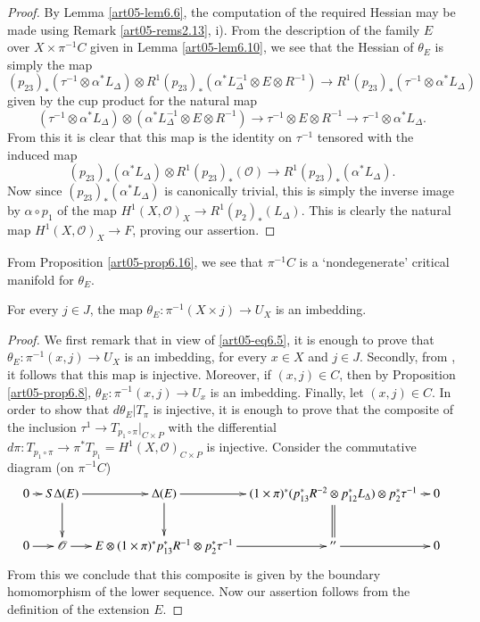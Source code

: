 \begin{proof}
By Lemma \ref{art05-lem6.6}, the computation of the required Hessian
may be made using Remark \ref{art05-rems2.13}, i). From the description
of the family $E$ over $X\times \pi^{-1}C$ given in
Lemma \ref{art05-lem6.10}, we see that the Hessian of $\theta_{E}$ is
simply the map
{\fontsize{10pt}{12pt}\selectfont
$$
(p_{23})_{*}(\tau^{-1}\otimes \alpha^{*}L_{\Delta})\otimes
R^{1}(p_{23})_{*}(\alpha^{*}L^{-1}_{\Delta}\otimes E\otimes R^{-1})\to
R^{1}(p_{23})_{*}(\tau^{-1}\otimes \alpha^{*}L_{\Delta})
$$}
given by the cup product for the natural map
$$
(\tau^{-1}\otimes \alpha^{*}L_{\Delta})\otimes
(\alpha^{*}L^{-1}_{\Delta}\otimes E\otimes R^{-1})\to \tau^{-1}\otimes
E\otimes R^{-1}\to \tau^{-1}\otimes \alpha^{*}L_{\Delta}.
$$
From this it is clear that this map is the identity on $\tau^{-1}$
tensored with the induced map
$$
(p_{23})_{*}(\alpha^{*}L_{\Delta})\otimes
R^{1}(p_{23})_{*}(\mathscr{O})\to
R^{1}(p_{23})_{*}(\alpha^{*}L_{\Delta}).
$$ 
Now since
$(p_{23})_{*}(\alpha^{*}L_{\Delta})$ is canonically trivial, this is
simply the inverse image by $\alpha\circ p_{1}$ of the map
$H^{1}(X,\mathscr{O})_{X}\to R^{1}(p_{2})_{*}(L_{\Delta})$. This is
clearly the natural map $H^{1}(X,\mathscr{O})_{X}\to F$, proving our
assertion. 
\end{proof}

\begin{remark}\label{art05-rem6.17}
From Proposition \ref{art05-prop6.16}, we see that $\pi^{-1}C$ is a
`nondegenerate' critical manifold for $\theta_{E}$. 
\end{remark}

\begin{proposition}\label{art05-prop6.18}
For every $j\in J$, the map $\theta_{E}:\pi^{-1}(X\times j)\to U_{X}$
is an imbedding.
\end{proposition}

\begin{proof}
We first remark that in view of \ref{art05-eq6.5}, it is enough to
prove that $\theta_{E}:\pi^{-1}(x,j)\to U_{X}$ is an imbedding, for
every $x\in X$ and $j\in J$. Secondly, from \cite[Lemma
10.1]{art05-key3}, it follows that this map is injective. Moreover, if
$(x,j)\in C$, then by Proposition \ref{art05-prop6.8},
$\theta_{E}:\pi^{-1}(x,j)\to U_{x}$ is an\pageoriginale
imbedding. Finally, let $(x,j)\in C$. In order to show that
$d\theta_{E}|T_{\pi}$ is injective, it is enough to prove that the
composite of the inclusion $\tau^{1}\to T_{p_{1}\circ\pi}|_{C\times
P}$ with the differential $d\pi
:T_{p_{1}\circ\pi}\to \pi^{*}T_{p_{1}}=H^{1}(X,\mathscr{O})_{C\times
P}$ is injective. Consider the commutative diagram (on $\pi^{-1}C$)
{\fontsize{9pt}{11pt}\selectfont
\[
\xymatrix@C=.25cm{
0\ar[r] & S\Delta(E)\ar[d]\ar[r] & \Delta(E)\ar[d]\ar[r] &
(1\times \pi)^{*}(p^{*}_{13}R^{-2}\otimes
p^{*}_{12}L_{\Delta})\otimes p^{*}_{2}\tau^{-1}\ar@{=}[d]\ar[r] & 0\\
0\ar[r] & \mathscr{O}\ar[r] & E\otimes
(1\times \pi)^{*}p^{*}_{13}R^{-1}\otimes p^{*}_{2}\tau^{-1}\ar[r] &
''\ar[r] & 0
}
\]}
From this we conclude that this composite is given by the boundary
homomorphism of the lower sequence. Now our assertion follows from the
definition of the extension $E$.
\end{proof}

